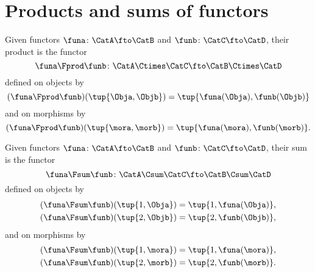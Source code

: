 \section{Products and sums of functors}
\label{sec:products-sums-functors}

\begin{ctdefinition}\label{def:product-of-functors}
    Given functors $\funa \colon \CatA \fto \CatB$ and $\funb \colon \CatC \fto \CatD$, their product is the functor $$\funa \Fprod \funb \colon \CatA \Ctimes \CatC \fto \CatB \Ctimes \CatD$$
    defined on objects by
    \begin{equation}
        (\funa \Fprod \funb) (\tup{\Obja, \Objb}) = \tup{\funa(\Obja), \funb(\Objb)}
    \end{equation}
    and on morphisms by
    \begin{equation}
        (\funa \Fprod \funb) (\tup{\mora, \morb}) = \tup{\funa(\mora), \funb(\morb)}.
    \end{equation}
\end{ctdefinition}

\begin{ctdefinition}\label{def:sum-of-functors}
    Given functors $\funa \colon \CatA \fto \CatB$ and $\funb \colon \CatC \fto \CatD$, their sum is the functor $$\funa \Fsum \funb \colon \CatA \Csum \CatC \fto \CatB \Csum \CatD$$
    defined on objects by
    \begin{equation}
        \begin{aligned}
            (\funa \Fsum \funb) (\tup{1, \Obja}) = \tup{1, \funa(\Obja)}, \\
            (\funa \Fsum \funb) (\tup{2, \Objb}) = \tup{2, \funb(\Objb)},
        \end{aligned}
    \end{equation}
    and on morphisms by
    \begin{equation}
        \begin{aligned}
            (\funa \Fsum \funb) (\tup{1, \mora}) = \tup{1, \funa(\mora)}, \\
            (\funa \Fsum \funb) (\tup{2, \morb}) = \tup{2, \funb(\morb)}.
        \end{aligned}
    \end{equation}
\end{ctdefinition}